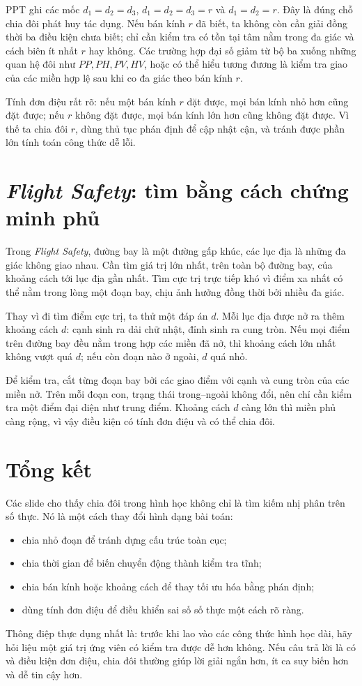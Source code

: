 \documentclass[11pt]{article}
\begin{document}
PPT ghi các mốc \(d_1=d_2=d_3\), \(d_1=d_2=d_3=r\) và \(d_1=d_2=r\). Đây là
đúng chỗ chia đôi phát huy tác dụng. Nếu bán kính \(r\) đã biết, ta không còn
cần giải đồng thời ba điều kiện chưa biết; chỉ cần kiểm tra có tồn tại tâm
nằm trong đa giác và cách biên ít nhất \(r\) hay không. Các trường hợp đại số
giảm từ bộ ba xuống những quan hệ đôi như \(PP,PH,PV,HV\), hoặc có thể hiểu
tương đương là kiểm tra giao của các miền hợp lệ sau khi co đa giác theo bán
kính \(r\).

Tính đơn điệu rất rõ: nếu một bán kính \(r\) đặt được, mọi bán kính nhỏ hơn
cũng đặt được; nếu \(r\) không đặt được, mọi bán kính lớn hơn cũng không đặt
được. Vì thế ta chia đôi \(r\), dùng thủ tục phán định để cập nhật cận, và
tránh được phần lớn tính toán công thức dễ lỗi.

\section{\textit{Flight Safety}: tìm bằng cách chứng minh phủ}

Trong \textit{Flight Safety}, đường bay là một đường gấp khúc, các lục địa là
những đa giác không giao nhau. Cần tìm giá trị lớn nhất, trên toàn bộ đường
bay, của khoảng cách tới lục địa gần nhất. Tìm cực trị trực tiếp khó vì điểm
xa nhất có thể nằm trong lòng một đoạn bay, chịu ảnh hưởng đồng thời bởi
nhiều đa giác.

Thay vì đi tìm điểm cực trị, ta thử một đáp án \(d\). Mỗi lục địa được nở ra
thêm khoảng cách \(d\): cạnh sinh ra dải chữ nhật, đỉnh sinh ra cung tròn.
Nếu mọi điểm trên đường bay đều nằm trong hợp các miền đã nở, thì khoảng cách
lớn nhất không vượt quá \(d\); nếu còn đoạn nào ở ngoài, \(d\) quá nhỏ.

Để kiểm tra, cắt từng đoạn bay bởi các giao điểm với cạnh và cung tròn của
các miền nở. Trên mỗi đoạn con, trạng thái trong--ngoài không đổi, nên chỉ
cần kiểm tra một điểm đại diện như trung điểm. Khoảng cách \(d\) càng lớn thì
miền phủ càng rộng, vì vậy điều kiện có tính đơn điệu và có thể chia đôi.

\section{Tổng kết}

Các slide cho thấy chia đôi trong hình học không chỉ là tìm kiếm nhị phân
trên số thực. Nó là một cách thay đổi hình dạng bài toán:
\begin{itemize}
  \item chia nhỏ đoạn để tránh dựng cấu trúc toàn cục;
  \item chia thời gian để biến chuyển động thành kiểm tra tĩnh;
  \item chia bán kính hoặc khoảng cách để thay tối ưu hóa bằng phán định;
  \item dùng tính đơn điệu để điều khiển sai số số thực một cách rõ ràng.
\end{itemize}

Thông điệp thực dụng nhất là: trước khi lao vào các công thức hình học dài,
hãy hỏi liệu một giá trị ứng viên có kiểm tra được dễ hơn không. Nếu câu trả
lời là có và điều kiện đơn điệu, chia đôi thường giúp lời giải ngắn hơn, ít
ca suy biến hơn và dễ tin cậy hơn.
\end{document}
